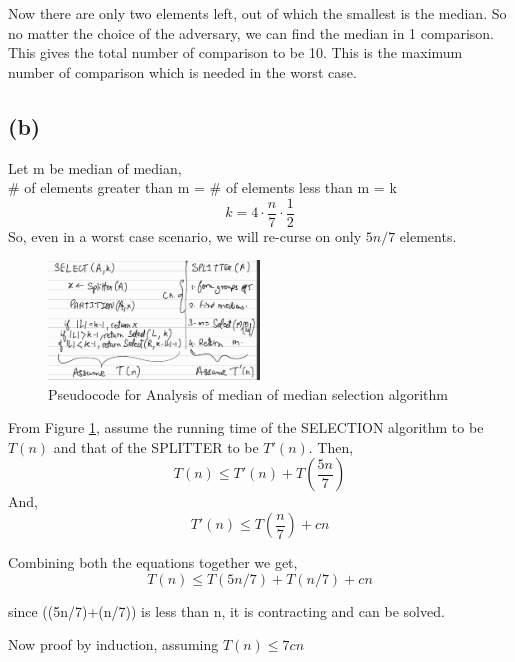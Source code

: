 \documentclass[a4paper,12pt]{article} %
\begin{document}
Now there are only two elements left, out of which the smallest is the median. So no matter the choice of the adversary, we can find the median in 1 comparison. \\

This gives the total number of comparison to be 10. This is the maximum number of comparison which is needed in the worst case.

\subsection*{(b)}

Let m be median of median,\\
\# of elements greater than m = \# of elements less than m = k
\begin{equation*}
      k = 4 \cdot \frac{n}{7} \cdot \frac{1}{2}
\end{equation*}
So, even in a worst case scenario, we will re-curse on only $5n/7$ elements. 
\begin{figure}
\centering
  \includegraphics[width=0.5\textwidth]{alg2.PNG}
  \caption{Pseudocode for Analysis of median of median selection algorithm}
  \label{fig:algorithm}
\end{figure}
From Figure \ref{fig:algorithm}, assume the running time of the SELECTION algorithm to be $T(n)$ and that of the SPLITTER to be $T'(n)$. Then,
\begin{equation*}
    T(n) \leq T'(n) + T\left(\frac{5n}{7}\right)
\end{equation*}
And,
\begin{equation*}
    T'(n) \leq T\left(\frac{n}{7}\right) + cn
\end{equation*}

Combining both the equations together we get,
\begin{equation*}
    T(n) \leq T(5n/7) + T(n/7) + cn
\end{equation*}

since ((5n/7)+(n/7)) is less than n, it is contracting and can be solved. 

Now proof by induction, assuming $T(n) \leq 7cn$\\
\end{document}
